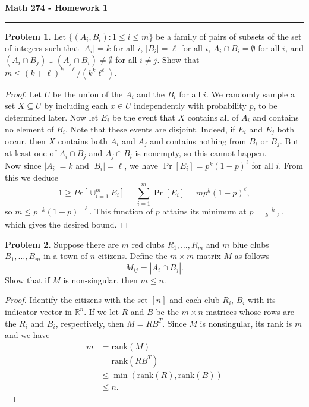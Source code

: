 \documentclass[11pt,letterpaper]{report}
\newcommand{\reals}{\mathbb{R}}
\newcommand{\rank}{\text{rank}}
\begin{document}
\begin{center}
{\bf \Large Math 274 - Homework 1}
\vspace{0.2cm}
\hrule
\end{center}

\noindent\textbf{Problem 1. }
Let $\{(A_i, B_i): 1\leq i \leq m\}$ be a family of pairs of subsets of the set of integers such that $|A_i| = k$ for all $i$, $|B_i| = \ell$ for all $i$,
$A_i\cap B_i = \emptyset$ for all $i$, and $(A_i\cap B_j)\cup (A_j\cap B_i) \neq \emptyset$ for all $i\neq j$.
Show that $m\leq (k+\ell)^{k+\ell}/(k^k\ell^\ell)$.

\begin{proof}
  Let $U$ be the union of the $A_i$ and the $B_i$ for all $i$.
  We randomly sample a set $X\subseteq U$ by including each $x\in U$ independently with probability $p$, to be determined later.
  Now let $E_i$ be the event that $X$ contains all of $A_i$ and contains no element of $B_i$.
  Note that these events are disjoint.
  Indeed, if $E_i$ and $E_j$ both occur, then $X$ contains both $A_i$ and $A_j$ and contains nothing from $B_i$ or $B_j$.
  But at least one of $A_i\cap B_j$ and $A_j\cap B_i$ is nonempty, so this cannot happen.\\

  Now since $|A_i| = k$ and $|B_i| = \ell$, we have $\Pr[E_i] = p^k(1-p)^\ell$ for all $i$.
  From this we deduce
  \[
  1 \geq Pr[\cup_{i=1}^mE_i] = \sum_{i=1}^m\Pr[E_i] = mp^k(1-p)^\ell,
  \]
  so $m \leq p^{-k}(1-p)^{-\ell}$.
  This function of $p$ attains its minimum at $p = \frac{k}{k+\ell}$, which gives the desired bound.
\end{proof}










\noindent\textbf{Problem 2. }
Suppose there are $m$ red clubs $R_1, \ldots, R_m$ and $m$ blue clubs $B_1, \ldots, B_m$ in a town of $n$ citizens.
Define the $m\times m$ matrix $M$ as follows
\[
M_{ij} = |A_i\cap B_j|.
\]
Show that if $M$ is non-singular, then $m\leq n$.
\begin{proof}
  Identify the citizens with the set $[n]$ and each club $R_i$, $B_i$ with its indicator vector in $\reals ^n$.
  If we let $R$ and $B$ be the $m\times n$ matrices whose rows are the $R_i$ and $B_i$, respectively, then $M = RB^T$.
  Since $M$ is nonsingular, its rank is $m$ and we have
  \begin{align*}
    m &= \rank(M)\\
    &= \rank(RB^T)\\
    &\leq \min(\rank(R), \rank(B))\\
    &\leq n.
  \end{align*}
\end{proof}
\end{document}
